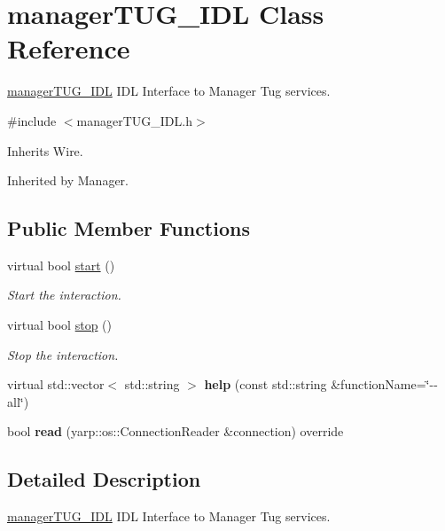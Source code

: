 \section{manager\+T\+U\+G\+\_\+\+I\+DL Class Reference}
\label{classmanagerTUG__IDL}


\hyperlink{classmanagerTUG__IDL}{manager\+T\+U\+G\+\_\+\+I\+DL} I\+DL Interface to Manager Tug services.  




{\ttfamily \#include $<$manager\+T\+U\+G\+\_\+\+I\+D\+L.\+h$>$}



Inherits Wire.



Inherited by Manager.

\subsection*{Public Member Functions}
\begin{DoxyCompactItemize}
\item 
virtual bool \hyperlink{classmanagerTUG__IDL_accbf9248b8f8f7688dba51a324624c0c}{start} ()
\begin{DoxyCompactList}\small\item\em Start the interaction. \end{DoxyCompactList}\item 
virtual bool \hyperlink{classmanagerTUG__IDL_a4e4054e0f008e1207c08df67eb92a6ac}{stop} ()
\begin{DoxyCompactList}\small\item\em Stop the interaction. \end{DoxyCompactList}\item 
\mbox{\label{classmanagerTUG__IDL_ad4b8169fc41c778f6bb4d0ac75a8a455}} 
virtual std\+::vector$<$ std\+::string $>$ {\bfseries help} (const std\+::string \&function\+Name=\char`\"{}-\/-\/all\char`\"{})
\item 
\mbox{\label{classmanagerTUG__IDL_aebc7f06915a0979d419c2d6b68281fa5}} 
bool {\bfseries read} (yarp\+::os\+::\+Connection\+Reader \&connection) override
\end{DoxyCompactItemize}


\subsection{Detailed Description}
\hyperlink{classmanagerTUG__IDL}{manager\+T\+U\+G\+\_\+\+I\+DL} I\+DL Interface to Manager Tug services. 

